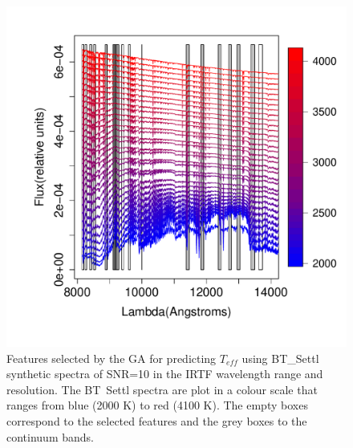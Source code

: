 \begin {figure}
 \centering
  \includegraphics[scale=0.55]{figs/BT-spectraAtIRTF-10-teff}
  \caption{Features selected by the GA for predicting $T_{eff}$ using
    BT\_Settl synthetic spectra of SNR=10 in the IRTF wavelength range
    and resolution. The BT\ Settl spectra are plot in a colour scale
    that ranges from blue (2000 K) to red (4100 K). The empty boxes
    correspond to the selected features and the grey boxes to the
    continuum bands.}
\label{fig:irtf-teff-10}
\end {figure}

